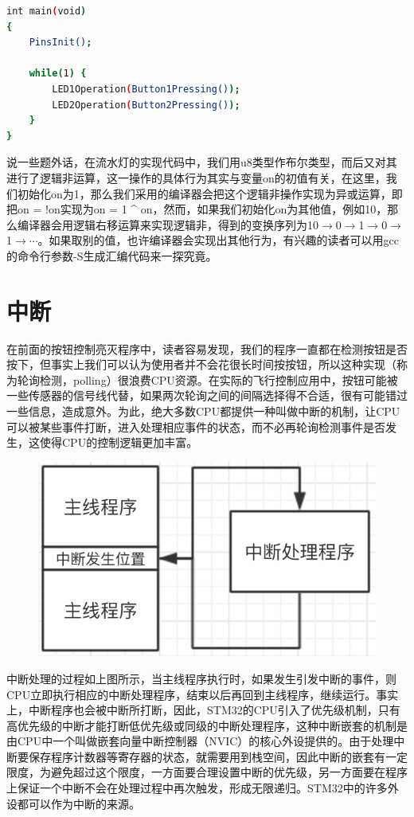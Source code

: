 		\begin{lstlisting}[language=bash, style=customStyleC, caption=按钮控制亮灭]
int main(void)
{
	PinsInit();
	
	while(1) {
		LED1Operation(Button1Pressing());
		LED2Operation(Button2Pressing());
	}
}
		\end{lstlisting}
		\par 
		
		说一些题外话，在流水灯的实现代码中，我们用u8类型作布尔类型，而后又对其进行了逻辑非运算，这一操作的具体行为其实与变量on的初值有关，在这里，我们初始化on为1，那么我们采用的编译器会把这个逻辑非操作实现为异或运算，即把on = !on实现为on = 1 \^{} on，然而，如果我们初始化on为其他值，例如10，那么编译器会用逻辑右移运算来实现逻辑非，得到的变换序列为10$\rightarrow$0$\rightarrow$1$\rightarrow$0$\rightarrow$1$\rightarrow$$\cdots$。如果取别的值，也许编译器会实现出其他行为，有兴趣的读者可以用gcc的命令行参数-S生成汇编代码来一探究竟。

\section{中断}
在前面的按钮控制亮灭程序中，读者容易发现，我们的程序一直都在检测按钮是否按下，但事实上我们可以认为使用者并不会花很长时间按按钮，所以这种实现（称为轮询检测，polling）很浪费CPU资源。在实际的飞行控制应用中，按钮可能被一些传感器的信号线代替，如果两次轮询之间的间隔选择得不合适，很有可能错过一些信息，造成意外。为此，绝大多数CPU都提供一种叫做中断的机制，让CPU可以被某些事件打断，进入处理相应事件的状态，而不必再轮询检测事件是否发生，这使得CPU的控制逻辑更加丰富。
\begin{figure}[h]
	\begin{center}
		\includegraphics{images/content/interrupt.png}
		\label{fig:interrupt}
	\end{center}
\end{figure}
\par 
中断处理的过程如上图所示，当主线程序执行时，如果发生引发中断的事件，则CPU立即执行相应的中断处理程序，结束以后再回到主线程序，继续运行。事实上，中断程序也会被中断所打断，因此，STM32的CPU引入了优先级机制，只有高优先级的中断才能打断低优先级或同级的中断处理程序，这种中断嵌套的机制是由CPU中一个叫做嵌套向量中断控制器（\ac{NVIC}）的核心外设提供的。由于处理中断要保存程序计数器等寄存器的状态，就需要用到栈空间，因此中断的嵌套有一定限度，为避免超过这个限度，一方面要合理设置中断的优先级，另一方面要在程序上保证一个中断不会在处理过程中再次触发，形成无限递归。STM32中的许多外设都可以作为中断的来源。

